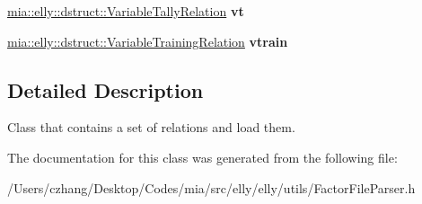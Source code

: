 \begin{DoxyCompactItemize}
\item 
\hypertarget{classmia_1_1elly_1_1utils_1_1_factor_file_parser_a6b0fe25be1e5144f853cd86da9876ecf}{\hyperlink{classmia_1_1elly_1_1dstruct_1_1_variable_tally_relation}{mia\-::elly\-::dstruct\-::\-Variable\-Tally\-Relation} {\bfseries vt}}\label{classmia_1_1elly_1_1utils_1_1_factor_file_parser_a6b0fe25be1e5144f853cd86da9876ecf}

\item 
\hypertarget{classmia_1_1elly_1_1utils_1_1_factor_file_parser_a0e81f19fe8c5c0532273f12b4028b769}{\hyperlink{classmia_1_1elly_1_1dstruct_1_1_variable_training_relation}{mia\-::elly\-::dstruct\-::\-Variable\-Training\-Relation} {\bfseries vtrain}}\label{classmia_1_1elly_1_1utils_1_1_factor_file_parser_a0e81f19fe8c5c0532273f12b4028b769}

\end{DoxyCompactItemize}


\subsection{Detailed Description}
Class that contains a set of relations and load them. 

The documentation for this class was generated from the following file\-:\begin{DoxyCompactItemize}
\item 
/\-Users/czhang/\-Desktop/\-Codes/mia/src/elly/elly/utils/Factor\-File\-Parser.\-h\end{DoxyCompactItemize}
